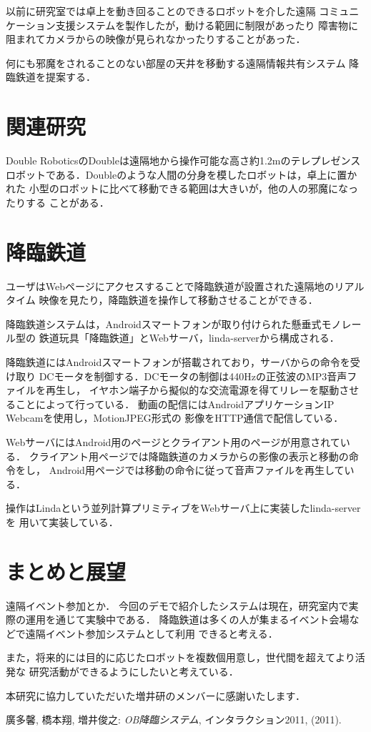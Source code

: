 \documentclass[submit,techreq]{ipsj}
\begin{document}
以前に研究室では卓上を動き回ることのできるロボットを介した遠隔
コミュニケーション支援システムを製作したが，動ける範囲に制限があったり
障害物に阻まれてカメラからの映像が見られなかったりすることがあった．

何にも邪魔をされることのない部屋の天井を移動する遠隔情報共有システム
降臨鉄道を提案する．

\section{関連研究}

Double RoboticsのDoubleは遠隔地から操作可能な高さ約1.2mのテレプレゼンス
ロボットである．Doubleのような人間の分身を模したロボットは，卓上に置かれた
小型のロボットに比べて移動できる範囲は大きいが，他の人の邪魔になったりする
ことがある．

\footnotetext{}

\section{降臨鉄道}

ユーザはWebページにアクセスすることで降臨鉄道が設置された遠隔地のリアルタイム
映像を見たり，降臨鉄道を操作して移動させることができる．

降臨鉄道システムは，Androidスマートフォンが取り付けられた懸垂式モノレール型の
鉄道玩具「降臨鉄道」とWebサーバ，linda-serverから構成される．

降臨鉄道にはAndroidスマートフォンが搭載されており，サーバからの命令を受け取り
DCモータを制御する．DCモータの制御は440Hzの正弦波のMP3音声ファイルを再生し，
イヤホン端子から擬似的な交流電源を得てリレーを駆動させることによって行っている．
動画の配信にはAndroidアプリケーションIP Webcamを使用し，MotionJPEG形式の
影像をHTTP通信で配信している．

WebサーバにはAndroid用のページとクライアント用のページが用意されている．
クライアント用ページでは降臨鉄道のカメラからの影像の表示と移動の命令をし，
Android用ページでは移動の命令に従って音声ファイルを再生している．

操作はLindaという並列計算プリミティブをWebサーバ上に実装したlinda-serverを
用いて実装している．

\section{まとめと展望}

遠隔イベント参加とか．
今回のデモで紹介したシステムは現在，研究室内で実際の運用を通じて実験中である．
降臨鉄道は多くの人が集まるイベント会場などで遠隔イベント参加システムとして利用
できると考える．

また，将来的には目的に応じたロボットを複数個用意し，世代間を超えてより活発な
研究活動ができるようにしたいと考えている．

\begin{acknowledgment}
本研究に協力していただいた増井研のメンバーに感謝いたします．
\end{acknowledgment}


\begin{thebibliography}{10}

廣多馨, 橋本翔, 増井俊之:
{\it OB降臨システム},
インタラクション2011, (2011).

\end{thebibliography}
\end{document}
